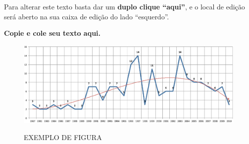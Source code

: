 
Para alterar este texto basta dar um 
\textbf{duplo clique “aqui”}, e o local de edição será aberto na sua caixa de edição do lado “esquerdo”.

\textbf{Copie e cole seu texto aqui.}

\begin{figure}[H]
\begin{center}
\caption{EXEMPLO DE FIGURA}
\includegraphics[width=12cm]{figuras/abntex2-modelo-img-grafico.pdf}
\label{fig:Yoriginal}
\end{center}
\end{figure}